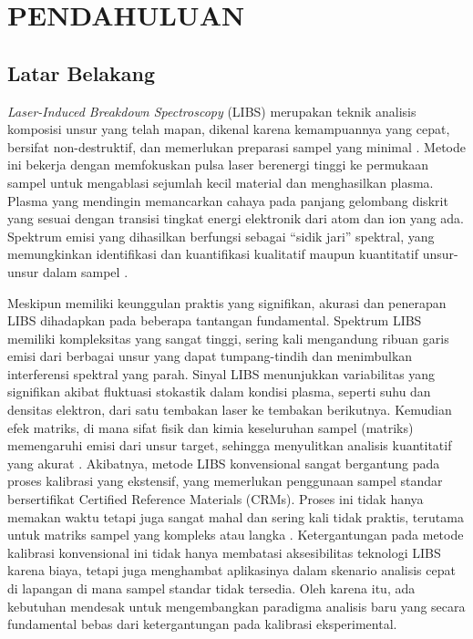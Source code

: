 \chapter{PENDAHULUAN}

\section{Latar Belakang}
\textit{Laser-Induced Breakdown Spectroscopy} (LIBS) merupakan teknik analisis komposisi unsur yang telah mapan, dikenal karena kemampuannya yang cepat, bersifat non-destruktif, dan memerlukan preparasi sampel yang minimal \parencite{Thorne1999, Cremers2013}. Metode ini bekerja dengan memfokuskan pulsa laser berenergi tinggi ke permukaan sampel untuk mengablasi sejumlah kecil material dan menghasilkan plasma. Plasma yang mendingin memancarkan cahaya pada panjang gelombang diskrit yang sesuai dengan transisi tingkat energi elektronik dari atom dan ion yang ada. Spektrum emisi yang dihasilkan berfungsi sebagai ``sidik jari'' spektral, yang memungkinkan identifikasi dan kuantifikasi kualitatif maupun kuantitatif unsur-unsur dalam sampel \parencite{Harmon2021}.

Meskipun memiliki keunggulan praktis yang signifikan, akurasi dan penerapan LIBS dihadapkan pada beberapa tantangan fundamental. Spektrum LIBS memiliki kompleksitas yang sangat tinggi, sering kali mengandung ribuan garis emisi dari berbagai unsur yang dapat tumpang-tindih dan menimbulkan interferensi spektral yang parah. Sinyal LIBS menunjukkan variabilitas yang signifikan akibat fluktuasi stokastik dalam kondisi plasma, seperti suhu dan densitas elektron, dari satu tembakan laser ke tembakan berikutnya. Kemudian efek matriks, di mana sifat fisik dan kimia keseluruhan sampel (matriks) memengaruhi emisi dari unsur target, sehingga menyulitkan analisis kuantitatif yang akurat \parencite{Gaudiuso2023}. Akibatnya, metode LIBS konvensional sangat bergantung pada proses kalibrasi yang ekstensif, yang memerlukan penggunaan sampel standar bersertifikat Certified Reference Materials (CRMs). Proses ini tidak hanya memakan waktu tetapi juga sangat mahal dan sering kali tidak praktis, terutama untuk matriks sampel yang kompleks atau langka \parencite{Porizka2018}. Ketergantungan pada metode kalibrasi konvensional ini tidak hanya membatasi aksesibilitas teknologi LIBS karena biaya, tetapi juga menghambat aplikasinya dalam skenario analisis cepat di lapangan di mana sampel standar tidak tersedia. Oleh karena itu, ada kebutuhan mendesak untuk mengembangkan paradigma analisis baru yang secara fundamental bebas dari ketergantungan pada kalibrasi eksperimental.

